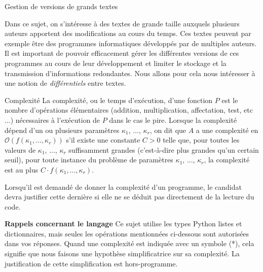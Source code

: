 Gestion de versions de grands textes 

Dans ce sujet, on s'intéresse à des textes de grande taille auxquels plusieurs auteurs apportent
des modifications au cours du temps. Ces textes peuvent par exemple être des programmes
informatiques développés par de multiples auteurs. Il est important de pouvoir efficacement
gérer les différentes versions de ces programmes au cours de leur développement et limiter le
stockage et la transmission d'informations redondantes. Nous allons pour cela nous intéresser à
une notion de \textit{différentiels} entre textes. 

\begin{defi}{Complexité}
La complexité, ou le temps d'exécution, d'une fonction $P$ est le nombre d'opérations élémentaires (addition, multiplication, affectation, test, etc ...) nécessaires à l'exécution
de $P$ dans le cas le pire. Lorsque la complexité dépend d'un ou plusieurs paramètres $\kappa_1$, ..., $\kappa_r$, on dit que $A$ a une complexité en $\mathcal{O}\left( f \left(\kappa_1, ..., \kappa_r  \right)\right)$ s'il existe une constante $C > 0$ telle que,
pour toutes les valeurs de $\kappa_1$, ..., $\kappa_r$ suffisamment grandes (c'est-à-dire plus grandes qu'un certain seuil), pour toute instance du problème de paramètres $\kappa_1$, ..., $\kappa_r$, la complexité est au plus
$C \cdot f \left(\kappa_1, ..., \kappa_r  \right)$.
\end{defi}

Lorsqu'il est demandé de donner la complexité d'un programme, le candidat devra justifier
cette dernière si elle ne se déduit pas directement de la lecture du code. 

\textbf{Rappels concernant le langage}  
Ce sujet utilise les types Python listes et dictionnaires, mais seules les opérations mentionnées ci-dessous sont autorisées dans vos réponses. Quand une complexité est indiquée avec un symbole (*), cela signifie que nous faisons une hypothèse
simplificatrice sur sa complexité. La justification de cette simplification est hors-programme. 

